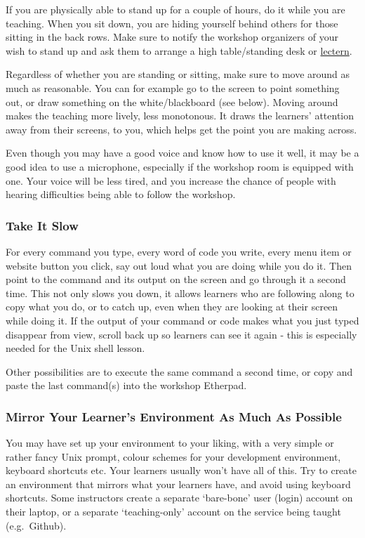 If you are physically able to stand up for a couple of hours, do it
while you are teaching. When you sit down, you are hiding yourself
behind others for those sitting in the back rows. Make sure to notify
the workshop organizers of your wish to stand up and ask them to arrange
a high table/standing desk or
\href{https://en.wikipedia.org/wiki/Lectern\#Academic\_context}{lectern}.

Regardless of whether you are standing or sitting, make sure to move
around as much as reasonable. You can for example go to the screen to
point something out, or draw something on the white/blackboard (see
below). Moving around makes the teaching more lively, less monotonous.
It draws the learners' attention away from their screens, to you, which
helps get the point you are making across.

Even though you may have a good voice and know how to use it well, it
may be a good idea to use a microphone, especially if the workshop room
is equipped with one. Your voice will be less tired, and you increase
the chance of people with hearing difficulties being able to follow the
workshop.

\subsubsection{Take It Slow}\label{take-it-slow}

For every command you type, every word of code you write, every menu
item or website button you click, say out loud what you are doing while
you do it. Then point to the command and its output on the screen and go
through it a second time. This not only slows you down, it allows
learners who are following along to copy what you do, or to catch up,
even when they are looking at their screen while doing it. If the output
of your command or code makes what you just typed disappear from view,
scroll back up so learners can see it again - this is especially needed
for the Unix shell lesson.

Other possibilities are to execute the same command a second time, or
copy and paste the last command(s) into the workshop Etherpad.

\subsubsection{Mirror Your Learner's Environment As Much As
Possible}\label{mirror-your-learners-environment-as-much-as-possible}

You may have set up your environment to your liking, with a very simple
or rather fancy Unix prompt, colour schemes for your development
environment, keyboard shortcuts etc. Your learners usually won't have
all of this. Try to create an environment that mirrors what your
learners have, and avoid using keyboard shortcuts. Some instructors
create a separate `bare-bone' user (login) account on their laptop, or a
separate `teaching-only' account on the service being taught
(e.g.~Github).


